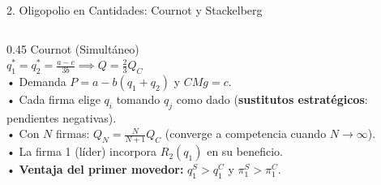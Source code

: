 \documentclass[aspectratio=169, 10pt]{beamer}
\begin{document}
\begin{frame}{2. Oligopolio en Cantidades: Cournot y Stackelberg}
\begin{columns}[T]
    \begin{column}{0.45\textwidth}
      {\scriptsize\color{grisTexto}Cournot (Simultáneo)}\\[1pt]
      {\normalsize\color{verdeAcento}\textbf{\(q_1^* = q_2^* = \frac{a-c}{3b} \implies Q = \frac{2}{3}Q_C\)}}\\[4pt]
      {\scriptsize
        • Demanda \(P = a - b(q_1 + q_2)\) y \(CMg = c\).\\
        • Cada firma elige \(q_i\) tomando \(q_j\) como dado (\textbf{sustitutos estratégicos}: pendientes negativas).\\
        • Con \(N\) firmas: \(Q_N = \frac{N}{N+1}Q_C\) (converge a competencia cuando \(N \to \infty\)).\\[4pt]
      }
      {\scriptsize
        • La firma 1 (líder) incorpora \(R_2(q_1)\) en su beneficio.\\
        • \textbf{Ventaja del primer movedor:} \(q_1^S > q_1^C\) y \(\pi_1^S > \pi_1^C\).
      }
    \end{column}
  \end{columns}

\end{frame}
\end{document}
